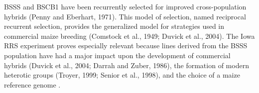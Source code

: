 BSSS and BSCB1 have been recurrently selected for improved cross-population hybrids (Penny and Eberhart, 1971). 
This model of selection, named reciprocal recurrent selection, provides the generalized model for strategies used in commercial maize breeding (Comstock et al., 1949; Duvick et al., 2004). 
The Iowa RRS experiment proves especially relevant because lines derived from the BSSS population have had a major impact upon the development of commercial hybrids (Duvick et al., 2004; Darrah and Zuber, 1986), the formation of modern heterotic groups (Troyer, 1999; Senior et al., 1998), and the choice of a maize reference genome \citep{schnable2009the-b73-maize}.